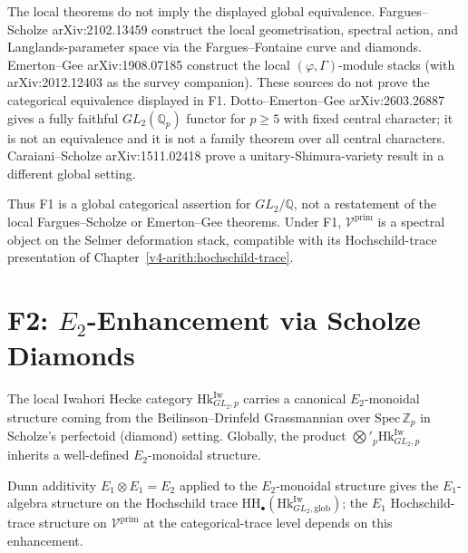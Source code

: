 \begin{remark}[form]
The local theorems do not imply the displayed global equivalence.
Fargues--Scholze arXiv:2102.13459 construct the local geometrisation,
spectral action, and Langlands-parameter space via the
Fargues--Fontaine curve and diamonds. Emerton--Gee arXiv:1908.07185
construct the local \((\varphi,\Gamma)\)-module stacks (with arXiv:2012.12403 as the survey companion). These sources
do not prove the categorical equivalence displayed in F1.
Dotto--Emerton--Gee arXiv:2603.26887 gives a fully faithful
\(GL_{2}(\mathbb{Q}_{p})\) functor for \(p\geq 5\) with fixed central
character; it is not an equivalence and it is not a family theorem
over all central characters.
Caraiani--Scholze arXiv:1511.02418 prove a unitary-Shimura-variety
result in a different global setting.

Thus F1 is a global categorical assertion for \(GL_{2}/\mathbb{Q}\),
not a restatement of the local Fargues--Scholze or Emerton--Gee
theorems. Under F1, \(\mathcal{V}^{\mathrm{prim}}\) is a spectral
object on the Selmer deformation stack, compatible with its
Hochschild-trace presentation of
Chapter~\ref{v4-arith:hochschild-trace}.
\end{remark}

\section{F2: \(E_{2}\)-Enhancement via Scholze Diamonds}
\label{v4-arith:of:F2}

\begin{conjecture}
\label{v4-arith:conj:F2-perfectoid-E2}
The local Iwahori Hecke category \(\mathrm{Hk}^{\mathrm{Iw}}_{GL_{2},p}\)
carries a canonical \(E_{2}\)-monoidal structure coming from the
Beilinson--Drinfeld Grassmannian over \(\mathrm{Spec}\,\mathbb{Z}_{p}\)
in Scholze's perfectoid (diamond) setting. Globally, the product
\(\bigotimes'_{p}\mathrm{Hk}^{\mathrm{Iw}}_{GL_{2},p}\) inherits a
well-defined \(E_{2}\)-monoidal structure.
\end{conjecture}

\begin{remark}
Dunn additivity \(E_{1}\otimes E_{1}=E_{2}\) applied to the
\(E_{2}\)-monoidal structure gives the \(E_{1}\)-algebra structure on
the Hochschild trace \(\mathrm{HH}_{\bullet}(\mathrm{Hk}^{\mathrm{Iw}}_{GL_{2},\mathrm{glob}})\);
the \(E_{1}\) Hochschild-trace structure on \(\mathcal{V}^{\mathrm{prim}}\)
at the categorical-trace level depends on this enhancement.
\end{remark}

